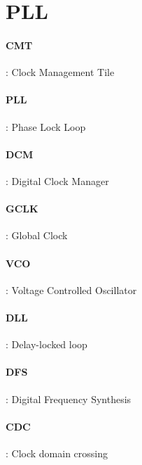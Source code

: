 \documentclass[resume]{subfiles}
\begin{document}
\section{PLL}
\paragraph{CMT} : Clock Management Tile
\paragraph{PLL} : Phase Lock Loop
\paragraph{DCM} : Digital Clock Manager
\paragraph{GCLK} : Global Clock
\paragraph{VCO} : Voltage Controlled Oscillator
\paragraph{DLL} : Delay-locked loop
\paragraph{DFS} : Digital Frequency Synthesis
\paragraph{CDC} : Clock domain crossing
\end{document}
